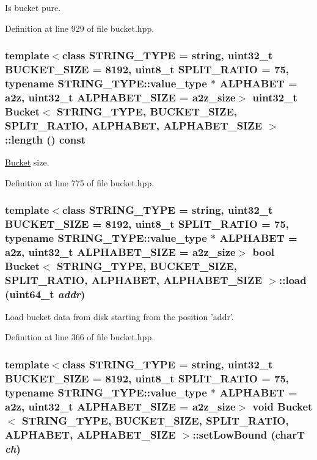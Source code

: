 Is bucket pure. 

Definition at line 929 of file bucket.hpp.\hypertarget{classBucket_5bb12720211df4d328ad406b4db73ba8}{
\subsubsection[{length}]{\setlength{\rightskip}{0pt plus 5cm}template$<$class STRING\_\-TYPE  = string, uint32\_\-t BUCKET\_\-SIZE = 8192, uint8\_\-t SPLIT\_\-RATIO = 75, typename STRING\_\-TYPE::value\_\-type $\ast$ ALPHABET = a2z, uint32\_\-t ALPHABET\_\-SIZE = a2z\_\-size$>$ uint32\_\-t {\bf Bucket}$<$ STRING\_\-TYPE, BUCKET\_\-SIZE, SPLIT\_\-RATIO, ALPHABET, ALPHABET\_\-SIZE $>$::length () const}}
\label{classBucket_5bb12720211df4d328ad406b4db73ba8}


\hyperlink{classBucket}{Bucket} size. 

Definition at line 775 of file bucket.hpp.\hypertarget{classBucket_c1379230ff19af55316bd31080205e95}{
\subsubsection[{load}]{\setlength{\rightskip}{0pt plus 5cm}template$<$class STRING\_\-TYPE  = string, uint32\_\-t BUCKET\_\-SIZE = 8192, uint8\_\-t SPLIT\_\-RATIO = 75, typename STRING\_\-TYPE::value\_\-type $\ast$ ALPHABET = a2z, uint32\_\-t ALPHABET\_\-SIZE = a2z\_\-size$>$ bool {\bf Bucket}$<$ STRING\_\-TYPE, BUCKET\_\-SIZE, SPLIT\_\-RATIO, ALPHABET, ALPHABET\_\-SIZE $>$::load (uint64\_\-t {\em addr})}}
\label{classBucket_c1379230ff19af55316bd31080205e95}


Load bucket data from disk starting from the position 'addr'. 

Definition at line 366 of file bucket.hpp.\hypertarget{classBucket_3e9104ad711ed5e5099e2b5079c06f6a}{
\subsubsection[{setLowBound}]{\setlength{\rightskip}{0pt plus 5cm}template$<$class STRING\_\-TYPE  = string, uint32\_\-t BUCKET\_\-SIZE = 8192, uint8\_\-t SPLIT\_\-RATIO = 75, typename STRING\_\-TYPE::value\_\-type $\ast$ ALPHABET = a2z, uint32\_\-t ALPHABET\_\-SIZE = a2z\_\-size$>$ void {\bf Bucket}$<$ STRING\_\-TYPE, BUCKET\_\-SIZE, SPLIT\_\-RATIO, ALPHABET, ALPHABET\_\-SIZE $>$::setLowBound (charT {\em ch})}}
\label{classBucket_3e9104ad711ed5e5099e2b5079c06f6a}


